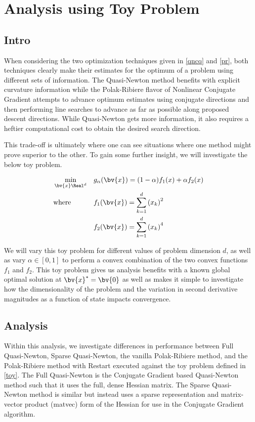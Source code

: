 \newpage
\section{Analysis using Toy Problem}
\subsection{Intro}
When considering the two optimization techniques given in \ref{qncq} and \ref{pr}, both techniques clearly make their estimates for the optimum of a problem using different sets of information. The Quasi-Newton method benefits with explicit curvature information while the Polak-Ribiere flavor of Nonlinear Conjugate Gradient attempts to advance optimum estimates using conjugate directions and then performing line searches to advance as far as possible along proposed descent directions. While Quasi-Newton gets more information, it also requires a heftier computational cost to obtain the desired search direction. 

This trade-off is ultimately where one can see situations where one method might prove superior to the other. To gain some further insight, we will investigate the below toy problem.

\begin{align}
    &\min_{\bv{x} \Real^d} &&g_{\alpha}(\bv{x}) = (1-\alpha) f_1(x) + \alpha f_2(x) \label{toy}\\
    &\text{where } &&f_1(\bv{x}) = \sum_{k=1}^d \left(x_k\right)^2 \nonumber \\
    & &&f_2(\bv{x}) = \sum_{k=1}^d \left(x_k\right)^4 \nonumber
\end{align}

We will vary this toy problem for different values of problem dimension $d$, as well as vary $\alpha \in [0,1]$ to perform a convex combination of the two convex functions $f_1$ and $f_2$. This toy problem gives us analysis benefits with a known global optimal solution at $\bv{x}^* = \bv{0}$ as well as makes it simple to investigate how the dimensionality of the problem and the variation in second derivative magnitudes as a function of state impacts convergence.

\subsection{Analysis}
Within this analysis, we investigate differences in performance between Full Quasi-Newton, Sparse Quasi-Newton, the vanilla Polak-Ribiere method, and the Polak-Ribiere method with Restart executed against the toy problem defined in \eqref{toy}. The Full Quasi-Newton is the Conjugate Gradient based Quasi-Newton method such that it uses the full, dense Hessian matrix. The Sparse Quasi-Newton method is similar but instead uses a sparse representation and matrix-vector product (matvec) form of the Hessian for use in the Conjugate Gradient algorithm.


